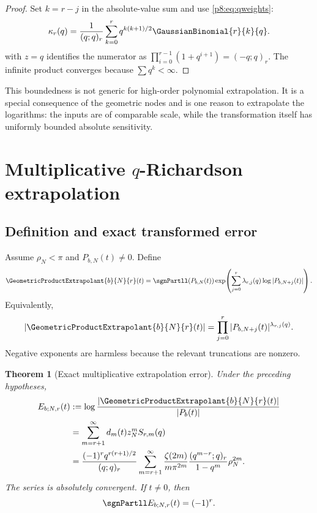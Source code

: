 \documentclass[11pt]{article}
\numberwithin{equation}{section}
\newtheorem{theorem}{Theorem}[section]
\theoremstyle{definition}
\theoremstyle{remark}
\begin{document}
\begin{proof}
Set $k=r-j$ in the absolute-value sum and use \cref{p8:eq:qweights}:
\[
\kappa_r(q)=\frac1{(q;q)_r}
\sum_{k=0}^{r}q^{k(k+1)/2}\GaussianBinomial{r}{k}{q}.
\]
 with $z=q$ identifies the numerator as
$\prod_{i=0}^{r-1}(1+q^{i+1})=(-q;q)_r$. The infinite product converges because $\sum q^k<\infty$.
\end{proof}

\begin{remark}
This boundedness is not generic for high-order polynomial extrapolation. It is a special consequence of the geometric nodes and is one reason to extrapolate the logarithms: the inputs are of comparable scale, while the transformation itself has uniformly bounded absolute sensitivity.
\end{remark}

\section{Multiplicative \texorpdfstring{$q$}{q}-Richardson extrapolation}
\label{p8:sec:qrichardson}

\subsection{Definition and exact transformed error}

Assume $\rho_N<\pi$ and $P_{b,N}(t)\ne0$. Define
\begin{equation}
\GeometricProductExtrapolant{b}{N}{r}(t)
=\sgnPartll(P_{b,N}(t))
\exp\!\left(\sum_{j=0}^{r}\lambda_{r,j}(q)
\log|P_{b,N+j}(t)|\right).
\label{p8:eq:Phat}
\end{equation}
Equivalently,
\begin{equation}
|\GeometricProductExtrapolant{b}{N}{r}(t)|
=\prod_{j=0}^{r}|P_{b,N+j}(t)|^{\lambda_{r,j}(q)}.
\label{p8:eq:Phat-product}
\end{equation}
Negative exponents are harmless because the relevant truncations are nonzero.

\begin{theorem}[Exact multiplicative extrapolation error]
\label{p8:thm:exact-rich-error}
Under the preceding hypotheses,
\begin{align}
E_{b;N,r}(t)
&:=\log\frac{|\GeometricProductExtrapolant{b}{N}{r}(t)|}{|P_b(t)|}
\label{p8:eq:E-def}\\
&=\sum_{m=r+1}^{\infty}d_m(t)z_N^mS_{r,m}(q)
\label{p8:eq:E-series}\\
&=\frac{(-1)^rq^{r(r+1)/2}}{(q;q)_r}
\sum_{m=r+1}^{\infty}
\frac{\zeta(2m)}{m\pi^{2m}}
\frac{(q^{m-r};q)_r}{1-q^m}\rho_N^{2m}.
\label{p8:eq:E-explicit}
\end{align}
The series is absolutely convergent. If $t\ne0$, then
\begin{equation}
\sgnPartll E_{b;N,r}(t)=(-1)^r.
\label{p8:eq:E-sign}
\end{equation}
\end{theorem}
\end{document}
